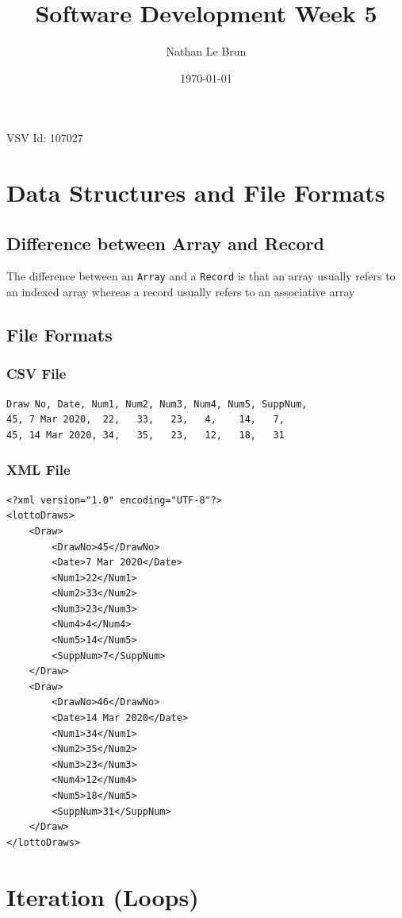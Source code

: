 \documentclass{article}
\title{Software Development Week 5}
\author{Nathan Le Brun}
\date{\today}
\begin{document}
    \maketitle
    VSV Id: 107027
    \section[Data Structures]{Data Structures and File Formats}
        \subsection{Difference between Array and Record}
            The difference between an \verb|Array| and a \verb|Record| is that an array usually refers to an indexed array whereas a record usually refers to an associative array
        \subsection{File Formats}
            \subsubsection{CSV File}
                \begin{verbatim}
Draw No, Date, Num1, Num2, Num3, Num4, Num5, SuppNum,
45, 7 Mar 2020,  22,   33,   23,   4,    14,   7,
45, 14 Mar 2020, 34,   35,   23,   12,   18,   31
                \end{verbatim}
            \subsubsection{XML File}
                \begin{verbatim}
<?xml version="1.0" encoding="UTF-8"?>
<lottoDraws>
    <Draw>
        <DrawNo>45</DrawNo>
        <Date>7 Mar 2020</Date>
        <Num1>22</Num1>
        <Num2>33</Num2>
        <Num3>23</Num3>
        <Num4>4</Num4>
        <Num5>14</Num5>
        <SuppNum>7</SuppNum>
    </Draw>
    <Draw>
        <DrawNo>46</DrawNo>
        <Date>14 Mar 2020</Date>
        <Num1>34</Num1>
        <Num2>35</Num2>
        <Num3>23</Num3>
        <Num4>12</Num4>
        <Num5>18</Num5>
        <SuppNum>31</SuppNum>
    </Draw>
</lottoDraws>
                \end{verbatim}
    \section[Iteration]{Iteration (Loops)}
\end{document}
